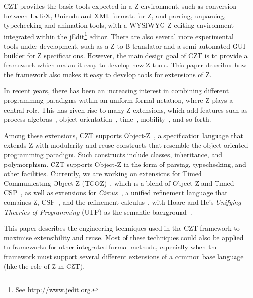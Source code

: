 \documentclass{llncs}
\newcommand{\Circus}{{\sf\slshape Circus}}
\begin{document}
  CZT provides the basic tools expected in a Z environment, such as
  conversion between \LaTeX, Unicode and XML formats for Z, and
  parsing, unparsing, typechecking and animation tools, with a WYSIWYG
  Z editing environment integrated within the
  jEdit\footnote{See \url{http://www.jedit.org}.} editor.
  There are also several more experimental tools under development,
  such as a Z-to-B translator and a semi-automated GUI-builder for
  Z specifications.  However, the main design goal of CZT is to
  provide a framework which makes it easy to develop new Z tools.
  This paper describes how the framework also makes it easy to develop
  tools for extensions of Z.

  In recent years, there has been an increasing interest in combining
  different programming paradigms within an uniform formal notation,
  where Z plays a central role. This has given rise to many Z
  extensions, which add features such as
  process algebras~\cite{fischer-1998,fischer-2000,circus.sem:intro},
  object orientation~\cite{oz,ohcircus},
  time~\cite{tcoz,circus.sem:real.time2},
  mobility~\cite{circus.sem:mobility}, and so forth.

  Among these extensions, CZT supports Object-Z~\cite{oz}, a
  specification language that extends Z with modularity and reuse
  constructs that resemble the object-oriented programming
  paradigm. Such constructs include classes, inheritance, and
  polymorphism. CZT supports Object-Z in the form of parsing,
  typechecking, and other facilities.  Currently, we are working on
  extensions for Timed Communicating Object-Z (TCOZ)~\cite{tcoz},
  which is a blend of Object-Z and Timed-CSP~\cite{timed-csp}, as well
  as extensions for \Circus~\cite{circus.sem:intro}, a unified
  refinement language that combines Z, CSP~\cite{csp.books:roscoe},
  and the refinement calculus~\cite{fm.ref:morgan}, with Hoare and
  He's \textit{Unifying Theories of Programming} (UTP) as the semantic
  background~\cite{hoare.utp}.

  This paper describes the engineering techniques used in the CZT framework
  to maximise extensibility and reuse.
  Most of these techniques could also be applied to frameworks
  for other integrated formal methods, especially when the
  framework must support several different extensions of a common
  base language (like the role of Z in CZT).
\end{document}
